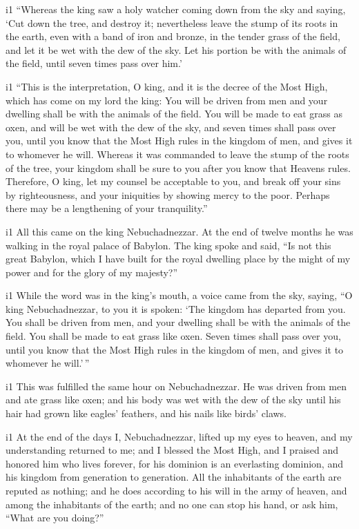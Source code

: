 i1 ``Whereas the king saw a holy watcher coming down from
the sky and saying, `Cut down the tree, and destroy it; nevertheless
leave the stump of its roots in the earth, even with a band of iron and
bronze, in the tender grass of the field, and let it be wet with the dew
of the sky. Let his portion be with the animals of the field, until
seven times pass over him.'

i1 ``This is the interpretation, O king, and it is the
decree of the Most High, which has come on my lord the king:
 You will be driven from men and your dwelling shall be
with the animals of the field. You will be made to eat grass as oxen,
and will be wet with the dew of the sky, and seven times shall pass over
you, until you know that the Most High rules in the kingdom of men, and
gives it to whomever he will.  Whereas it was commanded to
leave the stump of the roots of the tree, your kingdom shall be sure to
you after you know that Heavens rules.  Therefore, O king,
let my counsel be acceptable to you, and break off your sins by
righteousness, and your iniquities by showing mercy to the poor. Perhaps
there may be a lengthening of your tranquility.''

i1 All this came on the king Nebuchadnezzar. 
At the end of twelve months he was walking in the royal palace of
Babylon.  The king spoke and said, ``Is not this great
Babylon, which I have built for the royal dwelling place by the might of
my power and for the glory of my majesty?''

i1 While the word was in the king's mouth, a voice came
from the sky, saying, ``O king Nebuchadnezzar, to you it is spoken: `The
kingdom has departed from you.  You shall be driven from
men, and your dwelling shall be with the animals of the field. You shall
be made to eat grass like oxen. Seven times shall pass over you, until
you know that the Most High rules in the kingdom of men, and gives it to
whomever he will.'\,''

i1 This was fulfilled the same hour on Nebuchadnezzar. He
was driven from men and ate grass like oxen; and his body was wet with
the dew of the sky until his hair had grown like eagles' feathers, and
his nails like birds' claws.

i1 At the end of the days I, Nebuchadnezzar, lifted up my
eyes to heaven, and my understanding returned to me; and I blessed the
Most High, and I praised and honored him who lives forever, for his
dominion is an everlasting dominion, and his kingdom from generation to
generation.  All the inhabitants of the earth are reputed
as nothing; and he does according to his will in the army of heaven, and
among the inhabitants of the earth; and no one can stop his hand, or ask
him, ``What are you doing?''

